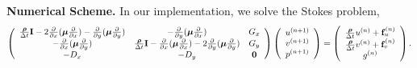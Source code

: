 \documentclass[9pt]{article}
\newcommand{\V}[1]{\boldsymbol{#1}}
\begin{document}
{\bf Numerical Scheme.} In our implementation, we solve the Stokes problem,
\begin{equation}\label{orginal_stress_form}
\left(\begin{array}{ccc}
\frac{{\V{\rho}}}{\Delta t}{\bf I}-2\frac{\partial}{\partial x}({\V{\mu}}\frac{\partial}{\partial x})-\frac{\partial}{\partial y}({\V{\mu}} \frac{\partial}{\partial y})     &  -\frac{\partial}{\partial y}({\V{\mu}} \frac{\partial}{\partial x})  & G_x\\
-\frac{\partial}{\partial x}({\V{\mu}} \frac{\partial}{\partial y})      &  \frac{{\V{\rho}}}{\Delta t}{\bf I}-\frac{\partial}{\partial x}({\V{\mu}} \frac{\partial}{\partial x})-2\frac{\partial}{\partial y}({\V{\mu}} \frac{\partial}{\partial y})  & G_y\\
-D_x    &         -D_y         &     {\bf 0}
\end{array}\right)
\left(\begin{array}{c}
{    u^{(n+1)}}  \\
{    v^{(n+1)}} \\
{    p^{(n+1)}}
\end{array}\right)=
\left(\begin{array}{c}
\frac{{\V{\rho}}}{\Delta t}u^{(n)}+{\bf f}_u^{(n)}  \\
\frac{{\V{\rho}}}{\Delta t}v^{(n)}+{\bf f}_v^{(n)}  \\
{    g^{(n)}}
\end{array}\right).
\end{equation}
\end{document}
